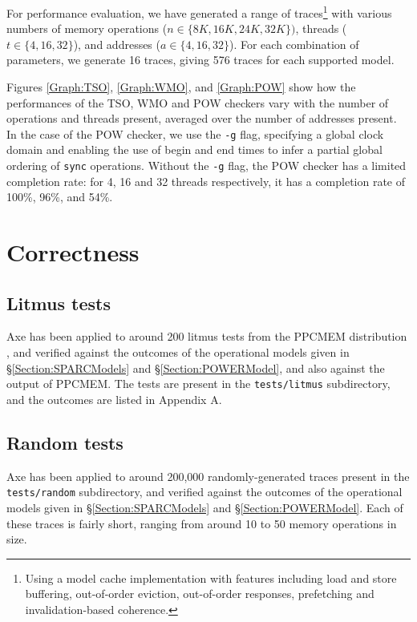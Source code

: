 \documentclass[11pt]{article}
\begin{document}
For performance evaluation, we have generated a range of
traces\footnote{Using a model cache implementation with features
including load and store buffering, out-of-order eviction,
out-of-order responses, prefetching and invalidation-based coherence.}
with various numbers of memory operations ($n \in \{8K, 16K, 24K,
32K\})$, threads ($t \in \{4, 16, 32\}$), and addresses ($a \in \{4,
16, 32\}$).  For each combination of parameters, we generate 16
traces, giving 576 traces for each supported model.

Figures \ref{Graph:TSO}, \ref{Graph:WMO}, and \ref{Graph:POW} show how
the performances of the TSO, WMO and POW checkers vary with the number
of operations and threads present, averaged over the number of
addresses present.  In the case of the POW checker, we use the
\verb!-g! flag, specifying a global clock domain and 
enabling the use of begin and end times to infer a partial global
ordering of \verb!sync! operations.  Without the \verb!-g! flag, the
POW checker has a limited completion rate: for 4, 16 and 32 threads
respectively, it has a completion rate of 100\%, 96\%, and 54\%.

\section{Correctness}
\label{Section:Correctness}

\subsection*{Litmus tests}

Axe has been applied to around 200 litmus tests from the PPCMEM
distribution \cite{PPCMEM}, and verified against the outcomes of the
operational models given in \S\ref{Section:SPARCModels} and
\S\ref{Section:POWERModel}, and also against the output of PPCMEM.
The tests are present in the \verb!tests/litmus! subdirectory, and the
outcomes are listed in Appendix A.

\subsection*{Random tests}

Axe has been applied to around 200,000 randomly-generated traces
present in the \verb!tests/random! subdirectory, and verified against
the outcomes of the operational models given in
\S\ref{Section:SPARCModels} and \S\ref{Section:POWERModel}.  Each of
these traces is fairly short, ranging from around 10 to 50 memory
operations in size.
\end{document}
